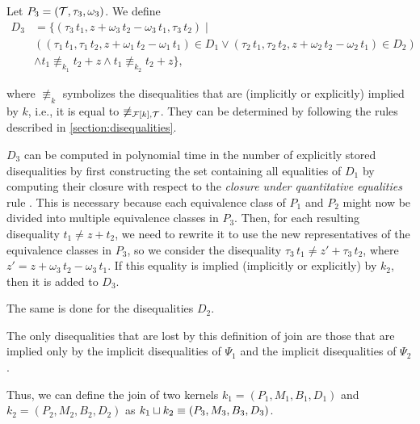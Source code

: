 Let $P_3 = (\mathcal{T}, \tau_3, \omega_3)$.
We define
\[
    \begin{array}{ll}
        D_3 & = \{(\tau_3\,t_1,  z + \omega_3\,t_2 - \omega_3\,t_1, \tau_3\,t_2) \mid                                                                            \\
            & ((\tau_1\,t_1, \tau_1\,t_2, z + \omega_1\,t_2 - \omega_1\,t_1) \in D_1 \lor (\tau_2\,t_1, \tau_2\,t_2, z + \omega_2\,t_2 - \omega_2\,t_1) \in D_2) \\
            & \land t_1 \nequiv_{k_1} t_2 + z \land t_1 \nequiv_{k_2} t_2 + z\},
    \end{array}
\]

where $\nequiv_{k}$ symbolizes the disequalities that are (implicitly or explicitly) implied by $k$, i.e.,
it is equal to $\not\equiv_{\mathcal{F}[k],\mathcal{T}}$.
They can be determined by following the rules described in \cref{section:disequalities}.

$D_3$ can be computed in polynomial time in the number of explicitly stored disequalities by first constructing the set containing all equalities of $D_1$ by computing their closure with respect to the \emph{closure under quantitative equalities} rule .
This is necessary because each equivalence class of $P_1$ and $P_2$ might now be divided into multiple equivalence classes in $P_3$.
Then, for each resulting disequality $t_1 \neq z + t_2$,
we need to rewrite it to use the new representatives of the equivalence classes in $P_3$,
so we consider the disequality $\tau_3\,t_1 \neq z' + \tau_3\,t_2$,
where $z' = z + \omega_3\,t_2 - \omega_3\,t_1$.
If this equality is implied (implicitly or explicitly) by $k_2$, then it is added to $D_3$.

The same is done for the disequalities $D_2$.

The only disequalities that are lost by this definition of join are those that are implied only by the implicit disequalities of $\Psi_1$ and the implicit disequalities of $\Psi_2$.

Thus, we can define the join of two kernels $k_1 = (P_1, M_1,B_1, D_1)$ and $k_2 = (P_2, M_2,B_2, D_2)$ as $k_1 \sqcup k_2 \equiv (P_3, M_3,B_3, D_3)$.
